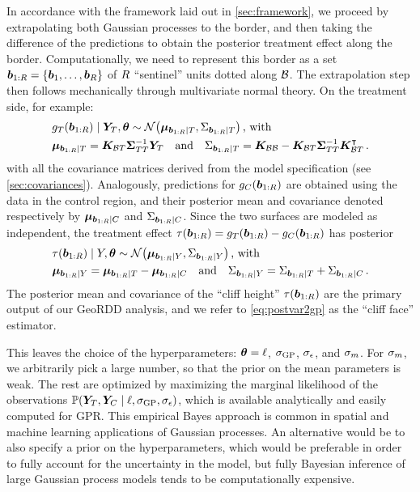 In accordance with the framework laid out in \autoref{sec:framework}, we proceed by extrapolating both Gaussian processes to the border,
and then taking the difference of the predictions to obtain the posterior treatment effect along the border.
Computationally, we need to represent this border as a set \(\bm{b}_{1:R}=\left\lbrace\bm{b}_1,\ldots,\bm{b}_R\right\rbrace\) of \(R\) ``sentinel'' units dotted along \(\mathcal{B}\).
The extrapolation step then follows mechanically through multivariate normal theory.
On the treatment side, for example:
\begin{equation}\begin{split}
    & g_\treat{}(\sentinels) \mid \yt{}, \hyperparam \sim \normal\del{\muvec_{\sentinels \mid T}, \Sigma_{\sentinels \mid T}} \,\text{, with} \\
    & \muvec_{\sentinels \mid T} =
    \KBT
    \STT^{-1} 
    \yt{} 
    \quad\text{and}\quad
    \Sigma_{\sentinels \mid T} =
    \KBB - \KBT \STT^{-1} \KBT\trans \,.
\end{split}
\label{eq:postvar2gp_t_or_c}
\end{equation}
with all the covariance matrices derived from the model specification (see \autoref{sec:covariances}).
Analogously, predictions for \(g_C{}(\bm{b}_{1:R})\) are obtained using the data in the control region,
and their posterior mean and covariance denoted respectively by \(\bm{\mu}_{\bm{b}_{1:R} \mid C}\) and \(\Sigma_{\bm{b}_{1:R} \mid C}\).
Since the two surfaces are modeled as independent, the treatment effect \(\tau(\bm{b}_{1:R})=g_T{}(\bm{b}_{1:R})-g_C{}(\bm{b}_{1:R})\) has posterior
\begin{equation}
    \begin{split}
        & \tau(\sentinels) \mid Y, \hyperparam \sim \normal\del{\muvec_{\sentinels \mid Y}, \Sigma_{\sentinels \mid Y}} \,\text{, with}\\
        & \muvec_{\sentinels \mid Y} = \muvec_{\sentinels \mid \treat} - \muvec_{\sentinels \mid \ctrol} \quad\text{and}\quad
        \Sigma_{\sentinels \mid Y} = \Sigma_{\sentinels \mid \treat} + \Sigma_{\sentinels \mid \ctrol} \,.
    \end{split}
    \label{eq:postvar2gp}
\end{equation}
The posterior mean and covariance of the ``cliff height'' \(\tau(\bm{b}_{1:R})\) are the primary output of our GeoRDD analysis, and we refer to \autoref{eq:postvar2gp} as the ``cliff face'' estimator.

This leaves the choice of the hyperparameters: \(\bm{\theta}=\ell\), \(\sigma_{\mathrm{GP}}\), \(\sigma_{\epsilon}\), and \(\sigma_{m}\).
For \(\sigma_{m}\), we arbitrarily pick a large number, so that the prior on the mean parameters is weak.
The rest are optimized by maximizing the marginal likelihood of the observations \(\Pr\del{\yt, \yc \mid \ell, \sigmaf, \sigman}\), which is available analytically and easily computed for GPR.
This empirical Bayes approach is common in spatial and machine learning applications of Gaussian processes.
An alternative would be to also specify a prior on the hyperparameters, which would be preferable in order to fully account for the uncertainty in the model, but fully Bayesian inference of large Gaussian process models tends to be computationally expensive.

